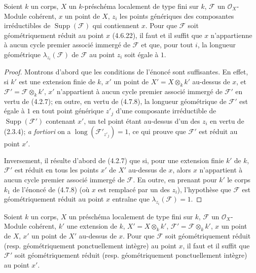 \begin{proposition}[4.7.10]
\label{IV.2.4.7.10-fr}
Soient $k$ un corps, $X$ un $k$-préschéma localement de type fini sur $k$,
$\mathscr F$ un $\mathcal O_X$-Module cohérent, $x$ un point de $X$, $z_i$
les points génériques des composantes irréductibles de
$\operatorname{Supp}(\mathscr F)$ qui contiennent $x$. Pour que $\mathscr F$
soit géométriquement réduit au point $x$ (4.6.22), il faut et il suffit que
$x$ n'appartienne à aucun cycle premier associé immergé de $\mathscr F$ et
que, pour tout $i$, la longueur géométrique $\lambda_{z_i}(\mathscr F)$ de
$\mathscr F$ au point $z_i$ soit égale à $1$.
\end{proposition}

\begin{proof}
Montrons d'abord que les conditions de l'énoncé sont suffisantes. En effet, si
$k'$ est une extension finie de $k$, $x'$ un point de
$X'=X\otimes_k k'$ au-dessus de $x$, et
$\mathscr F'=\mathscr F\otimes_k k'$, $x'$ n'appartient à aucun cycle premier
associé immergé de $\mathscr F'$ en vertu de (4.2.7); en outre, en vertu de
(4.7.8), la longueur géométrique de $\mathscr F'$ est égale à $1$ en tout
point générique $z'_j$ d'une composante irréductible de
$\operatorname{Supp}(\mathscr F')$ contenant $x'$, un tel point étant
au-dessus d'un des $z_i$ en vertu de (2.3.4); \emph{a fortiori} on a
$\operatorname{long}(\mathscr F'_{z'_j})=1$, ce qui prouve que $\mathscr F'$
est réduit au point $x'$.

Inversement, il résulte d'abord de (4.2.7) que si, pour une extension finie
$k'$ de $k$, $\mathscr F'$ est réduit en tous les points $x'$ de $X'$
au-dessus de $x$, alors $x$ n'appartient à aucun cycle premier associé immergé
de $\mathscr F$. En outre, en prenant pour $k'$ le corps $k_1$ de l'énoncé de
(4.7.8) (où $x$ est remplacé par un des $z_i$), l'hypothèse que $\mathscr F$
est géométriquement réduit au point $x$ entraîne que
$\lambda_{z_i}(\mathscr F)=1$.
\end{proof}

\begin{proposition}[4.7.11]
\label{IV.2.4.7.11-fr}
Soient $k$ un corps, $X$ un préschéma localement de type fini sur $k$,
$\mathscr F$ un $\mathcal O_X$-Module cohérent, $k'$ une extension de $k$,
$X'=X\otimes_k k'$, $\mathscr F'=\mathscr F\otimes_k k'$, $x$ un point de
$X$, $x'$ un point de $X'$ au-dessus de $x$. Pour que $\mathscr F$ soit
géométriquement réduit (resp. géométriquement ponctuellement intègre) au point
$x$, il faut et il suffit que $\mathscr F'$ soit géométriquement réduit (resp.
géométriquement ponctuellement intègre) au point $x'$.
\end{proposition}

